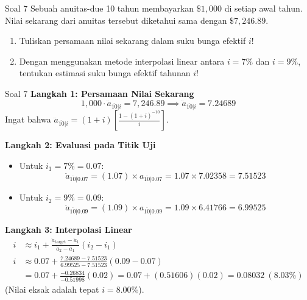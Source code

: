\documentclass[11pt,a4paper]{article}
\begin{document}
\begin{problembox}{Soal 7}
Sebuah anuitas-due 10 tahun membayarkan $\$1{,}000$ di setiap awal tahun. Nilai sekarang dari anuitas tersebut diketahui sama dengan $\$7{,}246.89$.
\begin{enumerate}[label=(\alph*)]
    \item Tuliskan persamaan nilai sekarang dalam suku bunga efektif $i$!
    \item Dengan menggunakan metode interpolasi linear antara $i = 7\%$ dan $i = 9\%$, tentukan estimasi suku bunga efektif tahunan $i$!
\end{enumerate}
\end{problembox}

\begin{solutionbox}{Soal 7}
\textbf{Langkah 1: Persamaan Nilai Sekarang}
\begin{equation*}
    1{,}000 \cdot \ddot{a}_{\overline{10}|i} = 7{,}246.89 \implies \ddot{a}_{\overline{10}|i} = 7.24689
\end{equation*}
Ingat bahwa $\ddot{a}_{\overline{10}|i} = (1+i) \left[\frac{1 - (1+i)^{-10}}{i}\right]$.

\textbf{Langkah 2: Evaluasi pada Titik Uji}
\begin{itemize}
    \item Untuk $i_1 = 7\% = 0.07$:
    \begin{equation*}
        \ddot{a}_{\overline{10}|0.07} = (1.07) \times a_{\overline{10}|0.07} = 1.07 \times 7.02358 = 7.51523
    \end{equation*}
    \item Untuk $i_2 = 9\% = 0.09$:
    \begin{equation*}
        \ddot{a}_{\overline{10}|0.09} = (1.09) \times a_{\overline{10}|0.09} = 1.09 \times 6.41766 = 6.99525
    \end{equation*}
\end{itemize}

\textbf{Langkah 3: Interpolasi Linear}
\begin{align*}
    i &\approx i_1 + \frac{\ddot{a}_{\text{target}} - \ddot{a}_1}{\ddot{a}_2 - \ddot{a}_1} (i_2 - i_1) \\[0.4em]
    i &\approx 0.07 + \frac{7.24689 - 7.51523}{6.99525 - 7.51523} (0.09 - 0.07) \\[0.4em]
    &= 0.07 + \frac{-0.26834}{-0.51998} (0.02) = 0.07 + (0.51606)(0.02) = \mathbf{0.08032 \ (8.03\%)}
\end{align*}
(Nilai eksak adalah tepat $i = 8.00\%$).
\end{solutionbox}
\end{document}
